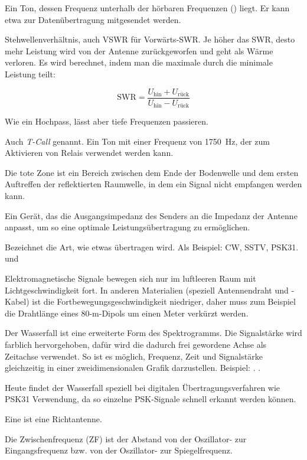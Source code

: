 {}

{Ein Ton, dessen Frequenz unterhalb der hörbaren Frequenzen () liegt. Er kann etwa zur Datenübertragung mitgesendet werden.}

{Stehwellenverhältnis, auch VSWR für Vorwärts-SWR. Je höher das SWR, desto mehr Leistung wird von der Antenne zurückgeworfen und geht als Wärme verloren. Es wird berechnet, indem man die maximale durch die minimale Leistung teilt:

\[\mathrm{SWR} = \frac{U_\mathrm{hin} + U_\mathrm{rück}}{U_\mathrm{hin}-U_\mathrm{rück}}\]
}

{Wie ein Hochpass, lässt aber tiefe Frequenzen passieren. }

{Auch \textit{T-Call} genannt. Ein Ton mit einer Frequenz von 1750 Hz, der zum Aktivieren von Relais verwendet werden kann.}

{Die tote Zone ist ein Bereich zwischen dem Ende der Bodenwelle und dem ersten Auftreffen der reflektierten Raumwelle, in dem ein Signal nicht empfangen werden kann.}

{Ein Gerät, das die Ausgangsimpedanz des Senders an die Impedanz der Antenne anpasst, um so eine optimale Leistungsübertragung zu ermöglichen.}

{Bezeichnet die Art, wie etwas übertragen wird. Als Beispiel: CW, SSTV, PSK31.  und }

{}

{Elektromagnetische Signale bewegen sich nur im luftleeren Raum mit Lichtgeschwindigkeit fort. In anderen Materialien (speziell Antennendraht und -Kabel) ist die Fortbewegungsgeschwindigkeit niedriger, daher muss zum Beispiel die Drahtlänge eines 80-m-Dipols um einen Meter verkürzt werden.
}

{}

{Der Wasserfall ist eine erweiterte Form des Spektrogramms. Die Signalstärke wird farblich hervorgehoben, dafür wird die dadurch frei gewordene Achse als Zeitachse verwendet. So ist es möglich, Frequenz, Zeit und Signalstärke gleichzeitig in einer zweidimensionalen Grafik darzustellen.  Beispiel: . .

Heute findet der Wasserfall speziell bei digitalen Übertragungsverfahren wie PSK31 Verwendung, da so einzelne PSK-Signale schnell erkannt werden können.}

{Eine  ist eine Richtantenne.}

{Die Zwischenfrequenz (ZF) ist der Abstand von der Oszillator- zur Eingangsfrequenz bzw. von der Oszillator- zur Spiegel­fre­quenz.}